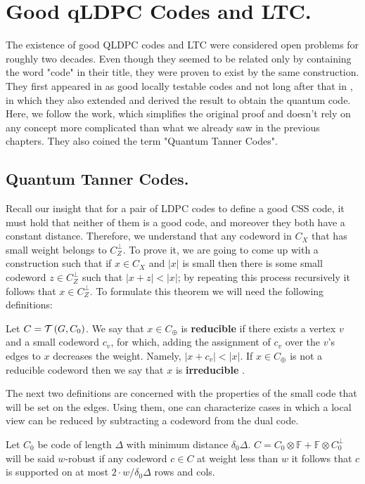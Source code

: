 \chapter{Good qLDPC Codes and LTC.}

The existence of good QLDPC codes and LTC were considered open problems for roughly two decades. Even though they seemed to be related only by containing the word "code" in their title, they were proven to exist by the same construction. They first appeared in \cite{Dinur} as good locally testable codes and not long after that in \cite{Pavel}, in which they also extended and derived the result to obtain the quantum code. Here, we follow the \cite{leverrier2022quantum} work, which simplifies the original proof and doesn't rely on any concept more complicated than what we already saw in the previous chapters. They also coined the term "Quantum Tanner Codes".


\section{Quantum Tanner Codes.}
Recall our insight that for a pair of LDPC codes to define a good CSS code, it must hold that neither of them is a good code, and moreover they both have a constant distance. Therefore, we understand that any codeword in $C_{X}$ that has small weight belongs to $C_{Z}^\perp$. To prove it, we are going to come up with a construction such that if $x \in C_{X}$ and $|x|$ is small then there is some small codeword $z \in C_{Z}^{\perp}$ such that $|x+z| < |x|$; by repeating this process recursively it follows that $x\in C_{Z}^{\perp}$. To formulate this theorem we will need the following definitions:
  
  \begin{definition} Let $C = \mathcal{T}\left( G, C_0 \right)$. We say that $x \in C_{\oplus}$ is \textbf{reducible} if there exists a vertex $v$ and a small codeword $c_v$, for which, adding the assignment of $c_v$ over the $v$'s edges to $x$ decreases the weight. Namely, $|x + c_{v}| < |x|$. If $x \in C_{\oplus}$ is not a reducible codeword then we say that $x$ is \textbf{irreducible} \label{ire}. \end{definition}

The next two definitions are concerned with the properties of the small code that will be set on the edges. Using them, one can characterize cases in which a local view can be reduced by subtracting a codeword from the dual code.

\begin{definition}[$w$-Robustness] Let $C_{0}$ be code of length $\Delta$ with minimum distance $\delta_{0}\Delta$. $C = C_{0} \otimes \mathbb{F} + \mathbb{F}\otimes C_{0}^{\perp}$ will be said $w$-robust if any codeword $c \in C$ at weight less than $w$ it follows that $c$ is supported on at most $2\cdot w/\delta_{0}\Delta$ rows and cols.
\end{definition}


